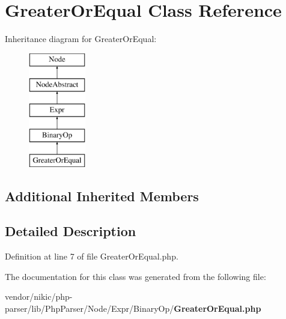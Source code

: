 \section{Greater\+Or\+Equal Class Reference}
\label{class_php_parser_1_1_node_1_1_expr_1_1_binary_op_1_1_greater_or_equal}
Inheritance diagram for Greater\+Or\+Equal\+:\begin{figure}[H]
\begin{center}
\leavevmode
\includegraphics[height=5.000000cm]{class_php_parser_1_1_node_1_1_expr_1_1_binary_op_1_1_greater_or_equal}
\end{center}
\end{figure}
\subsection*{Additional Inherited Members}


\subsection{Detailed Description}


Definition at line 7 of file Greater\+Or\+Equal.\+php.



The documentation for this class was generated from the following file\+:\begin{DoxyCompactItemize}
\item 
vendor/nikic/php-\/parser/lib/\+Php\+Parser/\+Node/\+Expr/\+Binary\+Op/{\bf Greater\+Or\+Equal.\+php}\end{DoxyCompactItemize}
